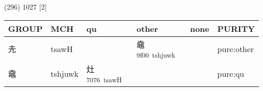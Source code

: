 \documentclass[14pt,a4paper]{scrartcl}
\begin{document}
(296) 1027 {[}2{]}

\begin{longtable}[c]{@{}llllll@{}}
\toprule
\begin{minipage}[b]{0.14\columnwidth}\raggedright\strut
GROUP
\strut\end{minipage} &
\begin{minipage}[b]{0.14\columnwidth}\raggedright\strut
MCH
\strut\end{minipage} &
\begin{minipage}[b]{0.14\columnwidth}\raggedright\strut
qu
\strut\end{minipage} &
\begin{minipage}[b]{0.14\columnwidth}\raggedright\strut
other
\strut\end{minipage} &
\begin{minipage}[b]{0.14\columnwidth}\raggedright\strut
none
\strut\end{minipage} &
\begin{minipage}[b]{0.14\columnwidth}\raggedright\strut
PURITY
\strut\end{minipage}\tabularnewline
\midrule
\endhead
\begin{minipage}[t]{0.14\columnwidth}\raggedright\strut
圥
\strut\end{minipage} &
\begin{minipage}[t]{0.14\columnwidth}\raggedright\strut
tsawH
\strut\end{minipage} &
\begin{minipage}[t]{0.14\columnwidth}\raggedright\strut
\strut\end{minipage} &
\begin{minipage}[t]{0.14\columnwidth}\raggedright\strut
鼀\textsuperscript{9f00~tshjuwk}
\strut\end{minipage} &
\begin{minipage}[t]{0.14\columnwidth}\raggedright\strut
\strut\end{minipage} &
\begin{minipage}[t]{0.14\columnwidth}\raggedright\strut
pure:other
\strut\end{minipage}\tabularnewline
\begin{minipage}[t]{0.14\columnwidth}\raggedright\strut
鼀
\strut\end{minipage} &
\begin{minipage}[t]{0.14\columnwidth}\raggedright\strut
tshjuwk
\strut\end{minipage} &
\begin{minipage}[t]{0.14\columnwidth}\raggedright\strut
灶\textsuperscript{7076~tsawH}
\strut\end{minipage} &
\begin{minipage}[t]{0.14\columnwidth}\raggedright\strut
\strut\end{minipage} &
\begin{minipage}[t]{0.14\columnwidth}\raggedright\strut
\strut\end{minipage} &
\begin{minipage}[t]{0.14\columnwidth}\raggedright\strut
pure:qu
\strut\end{minipage}\tabularnewline
\bottomrule
\end{longtable}
\end{document}
